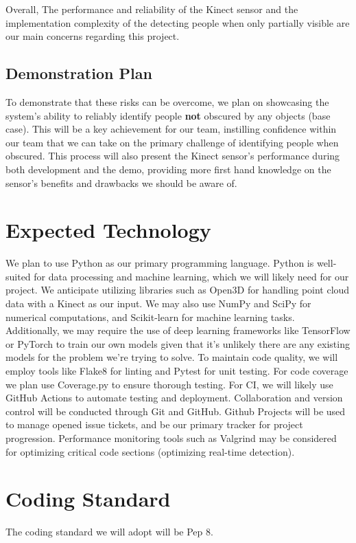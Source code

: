 \documentclass{article}
\begin{document}
Overall, The performance and reliability of the Kinect sensor and the implementation complexity of the detecting people when only partially visible are our main concerns regarding this project.

\subsection*{Demonstration Plan}

To demonstrate that these risks can be overcome, we plan on showcasing the system's ability to reliably identify people \textbf{not} obscured by any objects (base case). 
This will be a key achievement for our team, instilling confidence within our team that we can take on the primary challenge of identifying people when obscured.
This process will also present the Kinect sensor's performance during both development and the demo, providing more first hand knowledge on the sensor's benefits and drawbacks we should be aware of.

\section{Expected Technology}

We plan to use Python as our primary programming language. 
Python is well-suited for data processing and machine learning, which we will likely need for our project.
We anticipate utilizing libraries such as Open3D for handling point cloud data with a Kinect as our input. 
We may also use NumPy and SciPy for numerical computations, and Scikit-learn for machine learning tasks.\\

Additionally, we may require the use of deep learning frameworks like TensorFlow or PyTorch to train our own models given that it's unlikely there are any existing models for the problem we're trying to solve.
To maintain code quality, we will employ tools like Flake8 for linting and Pytest for unit testing. 
For code coverage we plan use Coverage.py to ensure thorough testing.
For CI, we will likely use GitHub Actions to automate testing and deployment.
Collaboration and version control will be conducted through Git and GitHub. Github Projects will be used to manage opened issue tickets, and be our primary tracker for project progression.
Performance monitoring tools such as Valgrind may be considered for optimizing critical code sections (optimizing real-time detection). 

\section{Coding Standard}
The coding standard we will adopt will be Pep 8. 
\end{document}
